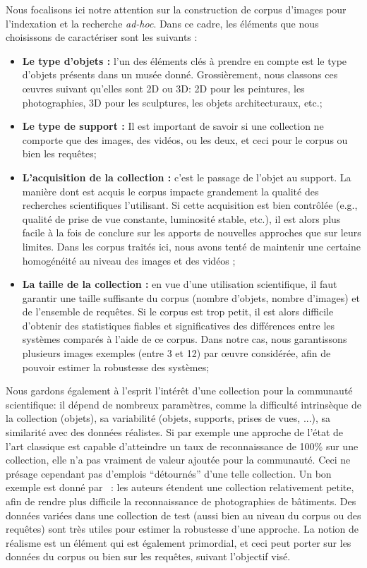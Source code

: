 Nous focalisons ici notre attention sur la construction de corpus d'images pour l'indexation et la recherche {\it ad-hoc}. Dans ce cadre, les éléments que nous choisissons de caractériser sont les suivants :
\begin{itemize}
\item {\bf Le type d'objets :} l'un des éléments clés à prendre en compte est le type d'objets présents dans un musée donné. Grossièrement, nous classons ces œuvres suivant qu'elles sont 2D ou 3D: 2D pour les peintures, les photographies, 3D pour les sculptures, les objets architecturaux, etc.;
\item {\bf Le type de support :} Il est important de savoir si une collection ne comporte que des images, des vidéos, ou les deux, et ceci pour le corpus ou bien les requêtes;
\item {\bf L'acquisition de la collection :} c'est le passage de l'objet au support. La manière dont est acquis le corpus impacte grandement la qualité des recherches scientifiques l'utilisant. Si cette acquisition est bien contrôlée (e.g., qualité de prise de vue constante, luminosité stable, etc.), il est alors plus facile à la fois de conclure sur les apports de nouvelles approches que sur leurs limites. Dans les corpus traités ici, nous avons tenté de maintenir une certaine homogénéité au niveau des images et des vidéos ;
\item {\bf La taille de la collection :} en vue d'une utilisation scientifique, il faut garantir une taille suffisante du corpus (nombre d'objets, nombre d'images) et de l'ensemble de requêtes. Si le corpus est trop petit, il est alors difficile d'obtenir des statistiques fiables et significatives des différences entre les systèmes comparés à l'aide de ce corpus. Dans notre cas, nous garantissons plusieurs images exemples (entre 3 et 12) par œuvre considérée, afin de pouvoir estimer la robustesse des systèmes;
\end{itemize}
Nous gardons également à l'esprit l'intérêt d'une collection pour la communauté scientifique: il dépend de nombreux paramètres, comme la difficulté intrinsèque de la collection (objets), sa variabilité (objets, supports, prises de vues, ...), sa similarité avec des données réalistes. Si par exemple une approche de l'état de l'art classique est capable d'atteindre un taux de reconnaissance de 100\% sur une collection, elle n'a pas vraiment de valeur ajoutée pour la communauté. Ceci ne présage cependant pas d'emplois ``détournés'' d'une telle collection. Un bon exemple est donné par~\cite{Chatfield2015} : les auteurs étendent une collection relativement petite, afin de rendre plus difficile la reconnaissance de photographies de bâtiments. Des données variées dans une collection de test (aussi bien au niveau du corpus ou des requêtes) sont très utiles pour estimer la robustesse d'une approche. La notion de réalisme est un élément qui est également primordial, et ceci peut porter sur les données du corpus ou bien sur les requêtes, suivant l'objectif visé.
